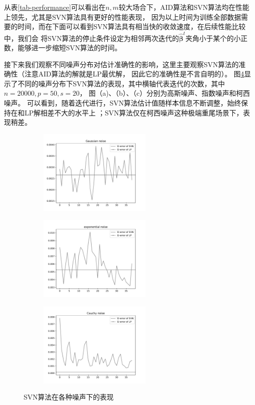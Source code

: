 从表\ref{tab-performance}可以看出在$n,m$较大场合下，AID算法和SVN算法均在性能上领先，尤其是SVN算法具有更好的性能表现，
因为以上时间为训练全部数据需要的时间，而在下面可以看到SVN算法具有相当快的收敛速度，在后续性能比较中，我们会
将SVN算法的停止条件设定为相邻两次迭代的$\hat{\bm{\beta}}^t$夹角小于某个的小正数，能够进一步缩短SVN算法的时间。

接下来我们观察不同噪声分布对估计准确性的影响，这里主要观察SVN算法的准确性（注意AID算法的解就是LP最优解，
因此它的准确性是不言自明的）。
图\ref{svn-noise}显示了不同的噪声分布下SVN算法的表现，其中横轴代表迭代的次数，其中$n=20000,p=50,s=20$，
图（a)、（b）、（c）分别为高斯噪声、指数噪声和柯西噪声。
可以看到，随着迭代进行，SVN算法估计值随样本信息不断调整，始终保持在和LP解相差不大的水平上
；SVN算法仅在柯西噪声这种极端重尾场景下，表现稍差。

\begin{figure}[H]
    \centering
    \begin{subfigure}[t]{0.3\textwidth}\label{svn-demo1}
    \includegraphics[width=5.5cm]{pics/chapter2/gaussian-svn.pdf}
    \end{subfigure}
    \begin{subfigure}[t]{0.3\textwidth}\label{svn-demo2}
    \includegraphics[width=5.5cm]{pics/chapter2/exp-svn.pdf}
    \end{subfigure}
    \begin{subfigure}[t]{0.3\textwidth}\label{svn-demo3}
    \includegraphics[width=5.5cm]{pics/chapter2/cauchy-svn.pdf}
    \end{subfigure}
    \caption{ \small SVN算法在各种噪声下的表现}
    \label{svn-noise}
\end{figure}

